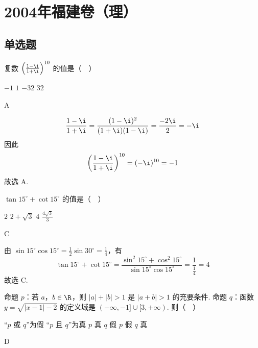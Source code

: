 \chapter{2004年福建卷（理）}
\section{单选题}
\begin{problem}
复数 \(\left(\frac{1-\i}{1+\i}\right)^{10}\) 的值是（\(\quad\)）

\choices
    {\(-1\)}
    {\(1\)}
    {\(-32\)}
    {\(32\)}
\end{problem}

\begin{answer}A\end{answer}

\begin{solution}
\[
\frac{1-\i}{1+\i}=\frac{(1-\i)^2}{(1+\i)(1-\i)}=\frac{-2\i}{2}=-\i
\]
因此
\[
\left(\frac{1-\i}{1+\i}\right)^{10}=(-\i)^{10}=-1
\]
故选 A.
\end{solution}

\begin{problem}
\(\tan 15^{\circ}+\cot 15^{\circ}\) 的值是（\(\quad\)）

\choices
    {\(2\)}
    {\(2+\sqrt{3}\)}
    {\(4\)}
    {\(\frac{4\sqrt{3}}{3}\)}
\end{problem}

\begin{answer}C\end{answer}

\begin{solution}
由 \(\sin15^{\circ}\cos15^{\circ}=\frac{1}{2}\sin30^{\circ}=\frac14\)，有
\[
\tan15^{\circ}+\cot15^{\circ}
 =\frac{\sin^2 15^{\circ}+\cos^2 15^{\circ}}{\sin15^{\circ}\cos15^{\circ}}
 =\frac{1}{\frac{1}{4}}=4
\]
故选 C.
\end{solution}

\begin{problem}
命题 \(p\)：若 \(a\)，\(b\in\R\)，则 \(|a|+|b|>1\) 是 \(|a+b|>1\) 的充要条件. 命题 \(q\)：函数 \(y=\sqrt{|x-1|-2}\) 的定义域是 \((-\infty,-1]\cup[3,+\infty)\). 则（\(\quad\)）

\choices
    {“\(p\) 或 \(q\)”为假}
    {“\(p\) 且 \(q\)”为真}
    {\(p\) 真 \(q\) 假}
    {\(p\) 假 \(q\) 真}
\end{problem}

\begin{answer}D\end{answer}

